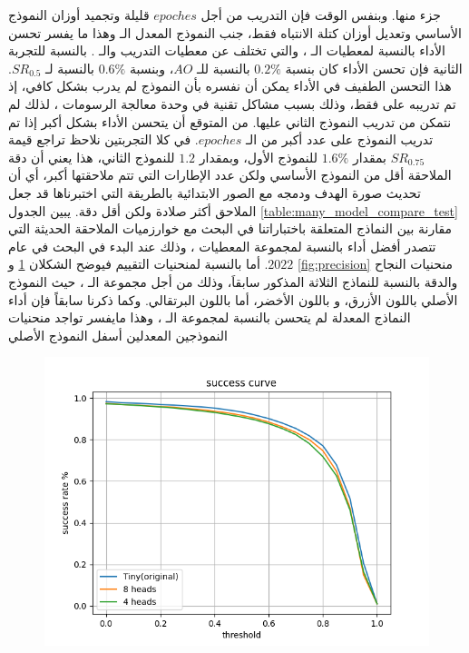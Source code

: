 جزء منها.
وبنفس الوقت فإن التدريب من أجل 
$epoches$
قليلة وتجميد أوزان النموذج الأساسي وتعديل أوزان كتلة الانتباه فقط، جنب النموذج المعدل الـ
وهذا ما يفسر تحسن الأداء بالنسبة لمعطيات الـ
،
والتي تختلف عن معطيات التدريب والـ
.
\newline
بالنسبة للتجربة الثانية
 فإن تحسن الأداء كان بنسبة 
$0.2\%$
بالنسبة للـ
$AO$،
وبنسبة 
$0.6\%$
بالنسبة لـ
$SR_{0.5}$.
هذا التحسن الطفيف في الأداء يمكن أن نفسره بأن النموذج لم يدرب بشكل كافي، إذ تم تدريبه على 
فقط،
وذلك بسبب مشاكل تقنية في وحدة معالجة الرسومات 
،
لذلك لم نتمكن من تدريب النموذج الثاني عليها.
\newline
من المتوقع أن يتحسن الأداء بشكل أكبر إذا تم تدريب النموذج على عدد أكبر من الـ
$epoches$.
\newline
في كلا التجربتين نلاحظ تراجع قيمة 
$SR_{0.75}$
بمقدار 
$1.6\%$
للنموذج الأول، وبمقدار 
$1.2$
للنموذج الثاني، هذا يعني أن دقة الملاحقة أقل من النموذج الأساسي ولكن عدد الإطارات التي تتم ملاحقتها أكبر، أي أن تحديث صورة الهدف ودمجه مع الصور الابتدائية بالطريقة التي اختبرناها قد جعل الملاحق أكثر صلادة ولكن أقل دقة.
\newline
يبين الجدول 
\ref{table:many_model_compare_test}
مقارنة بين النماذج المتعلقة باختباراتنا في البحث  مع خوارزميات الملاحقة الحديثة التي تتصدر أفضل أداء بالنسبة لمجموعة المعطيات 
،
وذلك عند البدء في البحث في عام
$2022$.
\newline
أما بالنسبة لمنحنيات التقييم فيوضح الشكلان
\ref{fig:successCurve}
و
\ref{fig:precision}
منحنيات النجاح والدقة بالنسبة للنماذج الثلاثة المذكور سابقاَ، وذلك من أجل مجموعة الـ
،
حيث النموذج الأصلي 
باللون الأزرق، و
باللون الأخضر، أما
باللون البرتقالي.
وكما ذكرنا سابقاً فإن أداء النماذج المعدلة لم يتحسن بالنسبة لمجموعة الـ
،
وهذا مايفسر تواجد منحنيات النموذجين المعدلين
أسفل النموذج الأصلي
\begin{figure}[H]
	\centerline{\includegraphics[width=\textwidth]{charts/successCurve}}
	\caption{}
	\label{fig:successCurve}
\end{figure}
